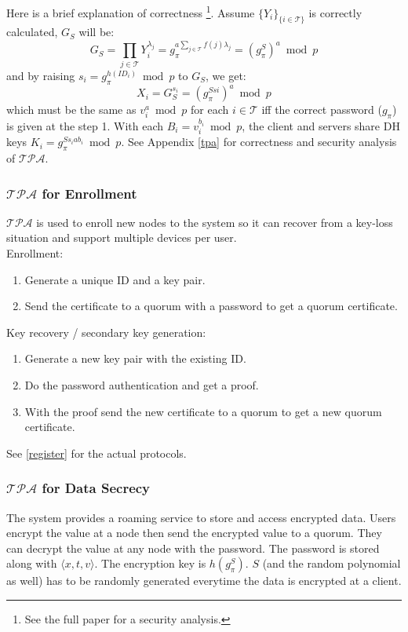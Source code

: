 \ifdefined\ABSTRACT
Here is a brief explanation of correctness
\footnote{See the full paper for a security analysis.}.
Assume $\{Y_i\}_{\{i \in \mathcal{T}\}}$ is correctly calculated,
$G_S$ will be:
\[
  G_S = \prod_{j \in \mathcal{T}}Y_i^{\lambda_j} = g_{\pi}^{a \sum_{j
      \in \mathcal{T}} f(j) \lambda_j} = (g_{\pi}^S)^a \bmod p
\]
and by raising $s_i = g_{\pi}^{h(ID_i)} \bmod p$ to $G_S$, we get:
\[
  X_i = G_S^{s_i} = (g_{\pi}^{Ssi})^a \bmod p
\]
which must be the same as $v_i^a \bmod p$ for each $i \in
\mathcal{T}$ iff the correct password ($g_{\pi}$) is given at the
step 1. With each $B_i = v_i^{b_i} \bmod p$, the client and servers
share DH keys $K_i = g_{\pi}^{Ss_iab_i} \bmod p$.
\else
See Appendix \ref{tpa} for correctness and security analysis of
$\mathcal{TPA}$.
\fi

\subsubsection*{$\mathcal{TPA}$ for Enrollment}
$\mathcal{TPA}$ is used to enroll new nodes to the system so it can
recover from a key-loss situation and support multiple devices per
user.\\

\noindent
Enrollment:
\begin{enumerate}
\item Generate a unique ID and a key pair.
\item Send the certificate to a quorum with a password to get a
  quorum certificate.
\end{enumerate}

\noindent
Key recovery / secondary key generation:
\begin{enumerate}
\item Generate a new key pair with the existing ID.
\item Do the password authentication and get a proof.
\item With the proof send the new certificate to a quorum to get a new
  quorum certificate.
\end{enumerate}
\ifdefined\ABSTRACT
\else
See \ref{register} for the actual protocols.
\fi

\subsubsection*{$\mathcal{TPA}$ for Data Secrecy}
The system provides a roaming service to store and access encrypted
data. Users encrypt the value at a node then send the encrypted value
to a quorum. They can decrypt the value at any node with the
password. The password is stored along with $\langle x, t, v \rangle$.
The encryption key is $h(g_{\pi}^S)$. $S$ (and the random polynomial
as well) has to be randomly generated everytime the data is encrypted
at a client.

